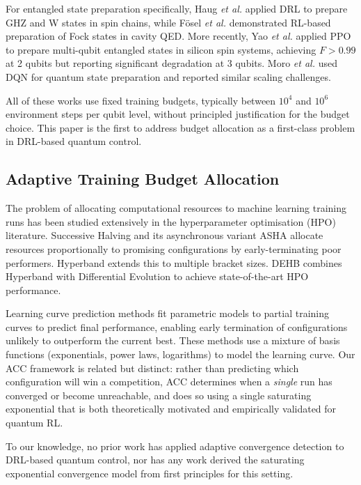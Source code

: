 \documentclass[twocolumn,superscriptaddress]{quantumarticle}
\begin{document}
For entangled state preparation specifically, Haug \emph{et al.}
\cite{haug2021classifying} applied DRL to prepare GHZ and W states in spin chains,
while Fösel \emph{et al.} \cite{fosel2018reinforcement} demonstrated RL-based
preparation of Fock states in cavity QED. More recently, Yao \emph{et al.}
\cite{yao2021reinforcement} applied PPO to prepare multi-qubit entangled states
in silicon spin systems, achieving $F > 0.99$ at 2 qubits but reporting significant
degradation at 3 qubits. Moro \emph{et al.} \cite{moro2021quantum} used DQN for
quantum state preparation and reported similar scaling challenges.

All of these works use fixed training budgets, typically between $10^4$ and $10^6$
environment steps per qubit level, without principled justification for the budget
choice. This paper is the first to address budget allocation as a first-class problem
in DRL-based quantum control.

\subsection{Adaptive Training Budget Allocation}

The problem of allocating computational resources to machine learning training runs
has been studied extensively in the hyperparameter optimisation (HPO) literature.
Successive Halving \cite{jamieson2016non} and its asynchronous variant ASHA
\cite{li2020system} allocate resources proportionally to promising configurations
by early-terminating poor performers. Hyperband \cite{li2017hyperband} extends this
to multiple bracket sizes. DEHB \cite{awad2021dehb} combines Hyperband with
Differential Evolution to achieve state-of-the-art HPO performance.

Learning curve prediction methods \cite{domhan2015speeding,klein2017learning}
fit parametric models to partial training curves to predict final performance,
enabling early termination of configurations unlikely to outperform the current
best. These methods use a mixture of basis functions (exponentials, power laws,
logarithms) to model the learning curve. Our ACC framework is related but distinct:
rather than predicting which configuration will win a competition, ACC determines
when a \emph{single} run has converged or become unreachable, and does so using
a single saturating exponential that is both theoretically motivated and empirically
validated for quantum RL.

To our knowledge, no prior work has applied adaptive convergence detection to
DRL-based quantum control, nor has any work derived the saturating exponential
convergence model from first principles for this setting.
\end{document}
